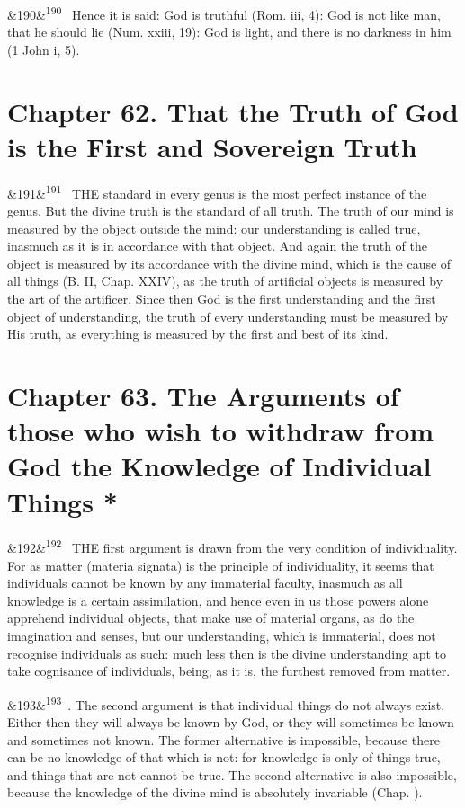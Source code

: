 \documentclass[12pt]{article}
\newcommand{\para}[1][]{\par\noindent\ifx&#1&\else\textsuperscript{\footnotesize #1}~\fi}
\begin{document}
\para[190] Hence it is said: God is truthful (Rom. iii, 4): God is not like man, that he should lie (Num. xxiii, 19): God is light, and there is no darkness in him (1 John i, 5).

\section*{Chapter 62. That the Truth of God is the First and Sovereign Truth}

\para[191] THE standard in every genus is the most perfect instance of the genus. But the divine truth is the standard of all truth. The truth of our mind is measured by the object outside the mind: our understanding is called true, inasmuch as it is in accordance with that object. And again the truth of the object is measured by its accordance with the divine mind, which is the cause of all things (B. II, Chap. XXIV), as the truth of artificial objects is measured by the art of the artificer. Since then God is the first understanding and the first object of understanding, the truth of every understanding must be measured by His truth, as everything is measured by the first and best of its kind.

\section*{Chapter 63. The Arguments of those who wish to withdraw from God the Knowledge of Individual Things *}

\para[192] THE first argument is drawn from the very condition of individuality. For as matter (materia signata) is the principle of individuality, it seems that individuals cannot be known by any immaterial faculty, inasmuch as all knowledge is a certain assimilation, and hence even in us those powers alone apprehend individual objects, that make use of material organs, as do the imagination and senses, but our understanding, which is immaterial, does not recognise individuals as such: much less then is the divine understanding apt to take cognisance of individuals, being, as it is, the furthest removed from matter.

\para[193] 2. The second argument is that individual things do not always exist. Either then they will always be known by God, or they will sometimes be known and sometimes not known. The former alternative is impossible, because there can be no knowledge of that which is not: for knowledge is only of things true, and things that are not cannot be true. The second alternative is also impossible, because the knowledge of the divine mind is absolutely invariable (Chap. ).
\end{document}
